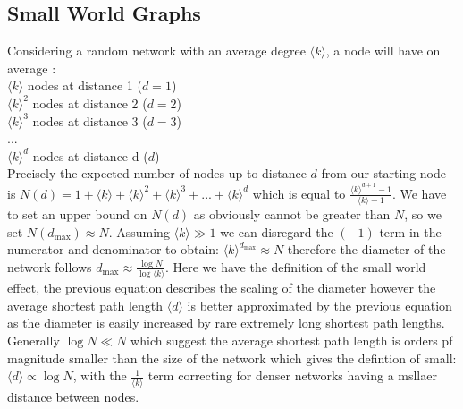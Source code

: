 \documentclass{article}
\begin{document}
        \subsection{Small World Graphs}
        Considering a random network with an average degree $\langle k \rangle$, a node will have on average \parencite{barabasi2013network}:\\
        $\langle k \rangle$ nodes at distance 1 ($d=1$)\\
        $\langle k \rangle^2$ nodes at distance 2 ($d=2$)\\
        $\langle k \rangle^3$ nodes at distance 3 ($d=3$)\\
        ...\\
        $\langle k \rangle^d$ nodes at distance d ($d$)\\
        Precisely the expected number of nodes up to distance $d$ from our starting node is $N(d) = 1+\langle k \rangle+\langle k \rangle^2+\langle k \rangle^3+...+\langle k \rangle^d$ which is equal to $\frac{\langle k \rangle^{d+1}-1}{\langle k \rangle -1}$. We have to set an upper bound on $N(d)$ as obviously cannot be greater than $N$, so we set $N(d_{\text{max}}) \approx N$. Assuming $\langle k \rangle \gg 1$ we can disregard the $(-1)$ term in the numerator and denominator to obtain: $\langle k \rangle^{d_{\text{max}}} \approx N$ therefore the diameter of the network follows $d_{\text{max}} \approx \frac{\log{N}}{\log{\langle k \rangle}}$. Here we have the definition of the small world effect, the previous equation describes the scaling of the diameter however the average shortest path length $\langle d \rangle$ is better approximated by the previous equation as the diameter is easily increased by rare extremely long shortest path lengths. Generally $\log{N} \ll N$ which suggest the average shortest path length is orders pf magnitude smaller than the size of the network which gives the defintion of small: $\langle d \rangle \propto \log{N}$, with the $\frac{1}{\langle k \rangle}$ term correcting for denser networks having a msllaer distance between nodes.
\end{document}
